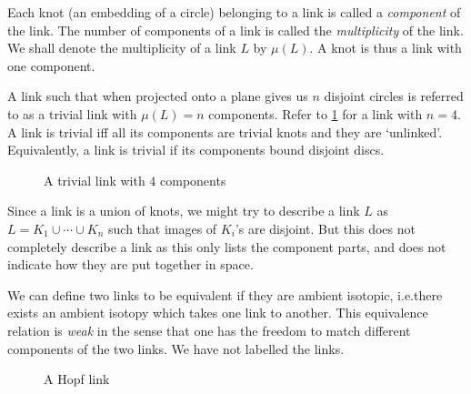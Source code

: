Each knot (an embedding of a circle) belonging to a link is called a \textit{component} of the link. The number of components of a link is called the \textit{multiplicity} of the link. We shall denote the multiplicity of a link \(L\) by \(\mu(L)\). A knot is thus a link with one component.

A link such that when projected onto a plane gives us \(n\) disjoint circles is referred to as a trivial link with \(\mu(L) = n\) components. Refer to \cref{fig:triviallink} for a link with \(n = 4\). A link is trivial iff all its components are trivial knots and they are `unlinked'. Equivalently, a link is trivial if its components bound disjoint discs.

\begin{figure}
    \centering
    \caption{A trivial link with \(4\) components}
    \label{fig:triviallink}
\end{figure}

Since a link is a union of knots, we might try to describe a link \(L\) as \(L = K_1 \cup \cdots \cup K_n\) such that images of \(K_i\)'s are disjoint. But this does not completely describe a link as this only lists the component parts, and does not indicate how they are put together in space.

We can define two links to be equivalent if they are ambient isotopic, i.e.\@ there exists an ambient isotopy which takes one link to another. This equivalence relation is \textit{weak} in the sense that one has the freedom to match different components of the two links. We have not labelled the links.

\begin{figure}
    \centering
    \caption{A Hopf link}
    \label{fig:hopflink}
\end{figure}

